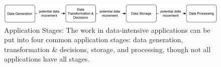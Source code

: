 \begin{figure}[htbp]
    \centering
        \includegraphics[width=1.0\textwidth]{figures/application-stages-new.pdf}
        \caption{Application Stages: The work in data-intensive
        applications can be put into four common application stages:
		data generation, transformation \& decisions, storage, and processing, though not all
		applications have all stages.
                \label{fig:figures_application-stages}}
\end{figure}




